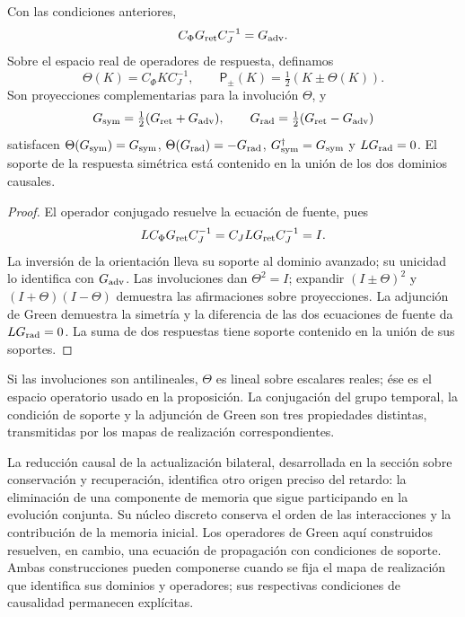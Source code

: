\begin{proposition}
\label{vii:prop:green-paridades}
Con las condiciones anteriores,
\[
 C_\Phi G_{\rm ret}C_J^{-1}=G_{\rm adv}.
\]
Sobre el espacio real de operadores de respuesta, definamos
\[
 \Theta(K)=C_\Phi K C_J^{-1},\qquad
 \mathsf P_\pm(K)=\tfrac12(K\pm\Theta(K)).
\]
Son proyecciones complementarias para la involución \(\Theta\), y
\begin{equation}
 G_{\rm sym}=\tfrac12(G_{\rm ret}+G_{\rm adv}),\qquad
 G_{\rm rad}=\tfrac12(G_{\rm ret}-G_{\rm adv})
 \label{vii:eq:descomposicion-green}
\end{equation}
satisfacen \(\Theta(G_{\rm sym})=G_{\rm sym}\),
\(\Theta(G_{\rm rad})=-G_{\rm rad}\),
\(G_{\rm sym}^{\dagger}=G_{\rm sym}\) y
\(LG_{\rm rad}=0\). El soporte de la respuesta simétrica está contenido
en la unión de los dos dominios causales.
\end{proposition}
\begin{proof}
El operador conjugado resuelve la ecuación de fuente, pues
\[
 LC_\Phi G_{\rm ret}C_J^{-1}=C_JLG_{\rm ret}C_J^{-1}=I.
\]
La inversión de la orientación lleva su soporte al dominio avanzado;
su unicidad lo identifica con \(G_{\rm adv}\). Las involuciones dan
\(\Theta^2=I\); expandir \((I\pm\Theta)^2\) y
\((I+\Theta)(I-\Theta)\) demuestra las afirmaciones sobre proyecciones.
La adjunción de Green demuestra la simetría y la diferencia de las dos
ecuaciones de fuente da \(LG_{\rm rad}=0\). La suma de dos respuestas
tiene soporte contenido en la unión de sus soportes.
\end{proof}

Si las involuciones son antilineales, \(\Theta\) es lineal sobre
escalares reales; ése es el espacio operatorio usado en la proposición.
La conjugación del grupo temporal, la condición de soporte y la
adjunción de Green son tres propiedades distintas, transmitidas por los
mapas de realización correspondientes.

La reducción causal de la actualización bilateral, desarrollada en la
sección sobre conservación y recuperación, identifica otro origen preciso
del retardo: la eliminación de una componente de memoria que sigue
participando en la evolución conjunta. Su núcleo discreto conserva el
orden de las interacciones y la contribución de la memoria inicial.
Los operadores de Green aquí construidos resuelven, en cambio, una
ecuación de propagación con condiciones de soporte. Ambas construcciones
pueden componerse cuando se fija el mapa de realización que identifica
sus dominios y operadores; sus respectivas condiciones de causalidad
permanecen explícitas.

